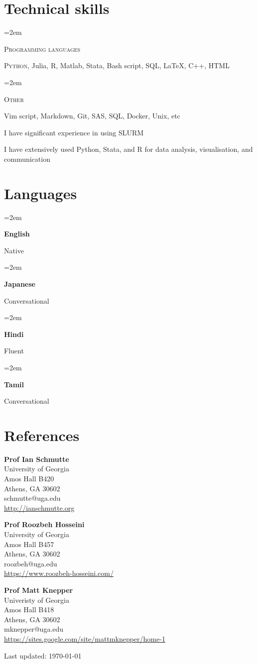 \documentclass[letterpaper]{article}
\newcommand{\skill}[2]{
  \noindent\hangindent=2em\hangafter=0
  \parbox{3\spacebox}{%
  \textsc{#1}} %
  \hfill
  #2 \par
}%
\newcommand{\lan}[2]{
    \noindent\hangindent=2em\hangafter=0
    \parbox{\spacebox}{%
        \textbf{#1}} %
     #2 \par
}%
\newlength{\spacebox}
\def\footerlink{}
\renewenvironment{itemize}{
  \begin{list}{}{
    \setlength{\leftmargin}{1.5em}
  }
}{
  \end{list}
}
\begin{document}
\section*{Technical skills}
\skill{Programming languages}{\textsc{Python}, Julia, R, Matlab, Stata, Bash script, SQL, \LaTeX, \textsc{C++}, HTML}
\skill{Other}{Vim script, Markdown, Git, SAS, SQL, Docker, Unix, etc}
\begin{itemize}
  \item I have significant experience in using \textsc{SLURM}
    \item I have extensively used Python, Stata, and R for data analysis, visualisation, and communication
\end{itemize}

\section*{Languages}
\lan{English}{Native} %
\lan{Japanese}{Conversational} %
\lan{Hindi}{Fluent} %
\lan{Tamil}{Conversational} %
\section*{References}
\begin{minipage}[t]{0.34\textwidth}

  \textbf{Prof Ian Schmutte}\\
  University of Georgia\\
  Amos Hall B420\\
  Athens, GA 30602 \\
  schmutte@uga.edu\\
  \url{http://ianschmutte.org}
\end{minipage}
\begin{minipage}[t]{0.33\textwidth}

  \textbf{Prof Roozbeh Hosseini}\\
  University of Georgia\\
  Amos Hall B457\\
  Athens, GA 30602\\
  roozbeh@uga.edu\\
  \url{https://www.roozbeh-hosseini.com/}
\end{minipage}
\begin{minipage}[t]{0.33\textwidth}

  \textbf{Prof Matt Knepper}\\
  Univeristy of Georgia\\
  Amos Hall B418\\
  Athens, GA 30602\\
  mknepper@uga.edu\\
  \url{https://sites.google.com/site/mattmknepper/home-1}
\end{minipage}



  \begin{footnotesize}
    Last updated: \today \\
    \url{\footerlink}  \\
  \end{footnotesize}
\end{document}

